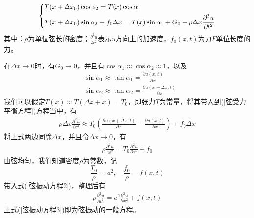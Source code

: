         \begin{align}
            \label{弦受力平衡方程}
            \left\{
                \begin{aligned}
                    &T(x+\Delta x_0) \cos \alpha _2 = T(x) \cos \alpha_1\\
                    &T(x+\Delta x_0) \sin \alpha _2 + f_0 \Delta x = T(x) \sin \alpha_1 +G_0 +\rho \Delta x
                    \frac{\partial ^2 u}{\partial t^2} \notag
                \end{aligned}
            \right.
        \end{align}
        其中：$\rho$为单位弦长的密度；$\frac{\partial ^2 u}{\partial t^2}$表示$u$方向上的加速度，$f_0(x,t)$为力$F$单位长度的力。
        \par
        在$\Delta x \rightarrow 0$时，有$G_0 \rightarrow 0$，并且有$\cos \alpha _1 \approx \cos \alpha _2 \approx 1$，以及
        \begin{align*}
            &\sin \alpha_1 \approx \tan \alpha_1 = \frac{\partial u(x,t)}{\partial x}\\
            &\sin \alpha_2 \approx \tan \alpha_2 = \frac{\partial u(x + \Delta x,t)}{\partial x}
        \end{align*}
        我们可以假定$T(x) \approx T(\Delta x + x) = T_0$，即张力$T$为常量，将其带入到(\ref{弦受力平衡方程})方程当中，有
        \begin{align}
            \rho \Delta x \frac{\partial^2 u}{\partial t ^2} \approx T_0 \left ( \frac{\partial u(x + \Delta x,t)}{\partial x} - \frac{\partial u(x,t)}{\partial x} \right) + f_0\Delta x
        \end{align}
        将上式两边同除$\Delta x$，并且令$\Delta x \rightarrow 0$，有
        \begin{align}
            \label{弦振动方程2}
            \rho \frac{\partial^2 u}{\partial t ^2} = T_0 \frac{\partial^2 u}{\partial x^2} + f_0
        \end{align}
        由弦均匀，我们知道密度$\rho$为常数，记
        \[
            \frac{T_0}{\rho} = a^2,\quad \frac{f_0}{\rho} = f(x,t)
        \]
        带入式(\ref{弦振动方程2})，整理后有
        \begin{align}
            \label{弦振动方程3}
            \rho \frac{\partial^2 u}{\partial t ^2} = a^2 \frac{\partial^2 u}{\partial x^2} + f(x,t)
        \end{align}
        上式(\ref{弦振动方程3})即为弦振动的一般方程。

